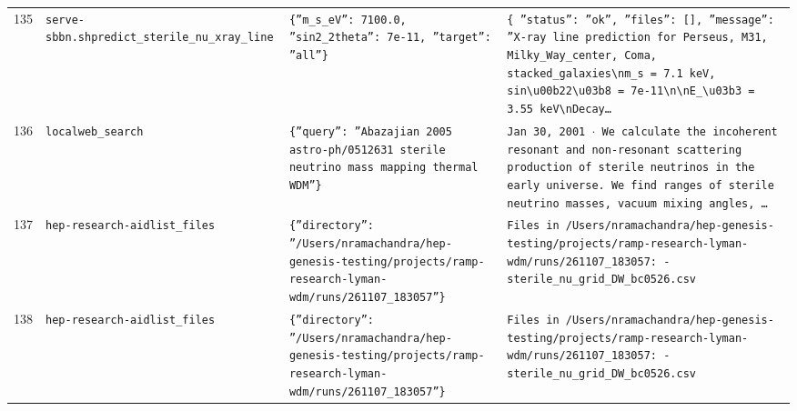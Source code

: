 \documentclass[11pt,a4paper]{article}
\begin{document}
\begin{longtable}{@{}p{}p{}p{}p{}@{}}
135 & \texttt{serve-sbbn.sh}\newline\texttt{predict\_\allowbreak{}sterile\_\allowbreak{}nu\_\allowbreak{}xray\_\allowbreak{}line} & \texttt{\{''m\_\allowbreak{}s\_\allowbreak{}eV'':\allowbreak{} 7100.0,\allowbreak{} ''sin2\_\allowbreak{}2theta'':\allowbreak{} 7e-11,\allowbreak{} ''target'':\allowbreak{} ''all''\}\allowbreak{}} & \texttt{\{   ''status'':\allowbreak{} ''ok'',\allowbreak{}   ''files'':\allowbreak{} []\allowbreak{},\allowbreak{}   ''message'':\allowbreak{} ''X-ray line prediction for Perseus,\allowbreak{} M31,\allowbreak{} Milky\_\allowbreak{}Way\_\allowbreak{}center,\allowbreak{} Coma,\allowbreak{} stacked\_\allowbreak{}galaxies\textbackslash{}\allowbreak{}nm\_\allowbreak{}s =\allowbreak{} 7.1 keV,\allowbreak{} sin\textbackslash{}\allowbreak{}u00b22\textbackslash{}\allowbreak{}u03b8 =\allowbreak{} 7e-11\textbackslash{}\allowbreak{}n\textbackslash{}\allowbreak{}nE\_\allowbreak{}\textbackslash{}\allowbreak{}u03b3 =\allowbreak{} 3.55 keV\textbackslash{}\allowbreak{}nDecay\ldots{}\allowbreak{}} \\
136 & \texttt{local}\newline\texttt{web\_\allowbreak{}search} & \texttt{\{''query'':\allowbreak{} ''Abazajian 2005 astro-ph/\allowbreak{}0512631 sterile neutrino mass mapping thermal WDM''\}\allowbreak{}} & \texttt{Jan 30,\allowbreak{} 2001 $\cdot$ We calculate the incoherent resonant and non-resonant scattering production of sterile neutrinos in the early universe. We find ranges of sterile neutrino masses,\allowbreak{} vacuum mixing angles,\allowbreak{} \ldots{}\allowbreak{}} \\
137 & \texttt{hep-research-aid}\newline\texttt{list\_\allowbreak{}files} & \texttt{\{''directory'':\allowbreak{} ''/\allowbreak{}Users/\allowbreak{}nramachandra/\allowbreak{}hep-genesis-testing/\allowbreak{}projects/\allowbreak{}ramp-research-lyman-wdm/\allowbreak{}runs/\allowbreak{}261107\_\allowbreak{}183057''\}\allowbreak{}} & \texttt{Files in /\allowbreak{}Users/\allowbreak{}nramachandra/\allowbreak{}hep-genesis-testing/\allowbreak{}projects/\allowbreak{}ramp-research-lyman-wdm/\allowbreak{}runs/\allowbreak{}261107\_\allowbreak{}183057:\allowbreak{}   - sterile\_\allowbreak{}nu\_\allowbreak{}grid\_\allowbreak{}DW\_\allowbreak{}bc0526.csv} \\
138 & \texttt{hep-research-aid}\newline\texttt{list\_\allowbreak{}files} & \texttt{\{''directory'':\allowbreak{} ''/\allowbreak{}Users/\allowbreak{}nramachandra/\allowbreak{}hep-genesis-testing/\allowbreak{}projects/\allowbreak{}ramp-research-lyman-wdm/\allowbreak{}runs/\allowbreak{}261107\_\allowbreak{}183057''\}\allowbreak{}} & \texttt{Files in /\allowbreak{}Users/\allowbreak{}nramachandra/\allowbreak{}hep-genesis-testing/\allowbreak{}projects/\allowbreak{}ramp-research-lyman-wdm/\allowbreak{}runs/\allowbreak{}261107\_\allowbreak{}183057:\allowbreak{}   - sterile\_\allowbreak{}nu\_\allowbreak{}grid\_\allowbreak{}DW\_\allowbreak{}bc0526.csv} \\

\end{longtable}
\end{document}
